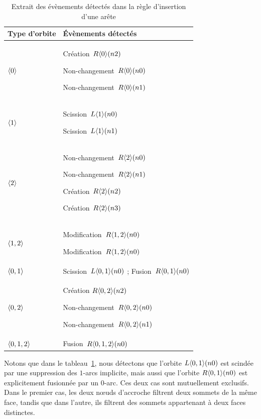 \begin{table}[H]
	\centering
	\begin{tabular}{|p{}|p{}|}
		\hline
		\centering Type d'orbite   & Évènements détectés             \\
		\hline

		\centering $\langle0\rangle$     & Création~$R\langle0\rangle(n2)$
		\par Non-changement~$R\langle0\rangle(n0)$
		\par Non-changement~$R\langle0\rangle(n1)$                         \\
		\hline

		\centering $\langle1\rangle$     & Scission~$L\langle1\rangle(n0)$
		\par Scission~$L\langle1\rangle(n1)$                               \\
		\hline

		\centering $\langle2\rangle$     & Non-changement~$R\langle2\rangle(n0)$
		\par Non-changement~$R\langle2\rangle(n1)$
		\par Création~$R\langle2\rangle(n2)$
		\par Création~$R\langle2\rangle(n3)$                               \\
		\hline

		\centering $\langle1,2\rangle$   & Modification~$R\langle1,2\rangle(n0)$
		\par Modification~$R\langle1,2\rangle(n0)$                         \\
		\hline

		\centering $\langle0,1\rangle$   & Scission~$L\langle0,1\rangle(n0)$
		; Fusion~$R\langle0,1\rangle(n0)$                               \\
		\hline

		\centering $\langle0,2\rangle$   & Création $R\langle0,2\rangle(n2)$
		\par Non-changement~$R\langle0,2\rangle(n0)$
		\par Non-changement~$R\langle0,2\rangle(n1)$                       \\
		\hline

		\centering $\langle0,1,2\rangle$ & Fusion~$R\langle0,1,2\rangle(n0)$     \\
		\hline
	\end{tabular}
	\caption{Extrait des évènements détectés dans la règle d'insertion d'une arête}
	\label{tab:formalisation-evenements-regle-jerboa-tableau-detection-insertion-arete}
\end{table}

Notons que dans le
tableau~\ref{tab:formalisation-evenements-regle-jerboa-tableau-detection-insertion-arete},
nous détectons que l'orbite \(L\langle0,1\rangle(n0)\) est scindée par une suppression
des \(1\)-arcs implicite, mais aussi que l'orbite \(R\langle0,1\rangle(n0)\) est
explicitement fusionnée par un \(0\)-arc. %
Ces deux cas sont mutuellement exclusifs. Dans le premier cas, les deux n\oe uds
d'accroche filtrent deux sommets de la même face, tandis que dans l'autre, ils
filtrent des sommets appartenant à deux faces distinctes. %


